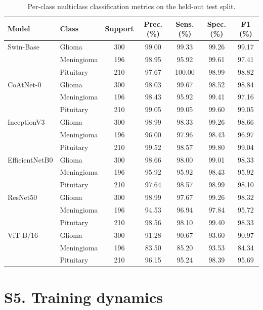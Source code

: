 \documentclass[11pt]{article}
\newcommand{\tablenumber}[1]{\setcounter{table}{\numexpr#1-1\relax}}
\begin{document}
\begin{table}[htbp]
\tablenumber{5}
\centering
\caption{Per-class multiclass classification metrics on the held-out test split.}
\label{tab:s5}
\small
\begin{tabular*}{\textwidth}{@{\extracolsep{\fill}}llccccc@{}}
\toprule
Model & Class & Support & Prec. (\%) & Sens. (\%) & Spec. (\%) & F1 (\%) \\
\midrule
Swin-Base & Glioma & 300 & 99.00 & 99.33 & 99.26 & 99.17 \\
 & Meningioma & 196 & 98.95 & 95.92 & 99.61 & 97.41 \\
 & Pituitary & 210 & 97.67 & 100.00 & 98.99 & 98.82 \\
\midrule
CoAtNet-0 & Glioma & 300 & 98.03 & 99.67 & 98.52 & 98.84 \\
 & Meningioma & 196 & 98.43 & 95.92 & 99.41 & 97.16 \\
 & Pituitary & 210 & 99.05 & 99.05 & 99.60 & 99.05 \\
\midrule
InceptionV3 & Glioma & 300 & 98.99 & 98.33 & 99.26 & 98.66 \\
 & Meningioma & 196 & 96.00 & 97.96 & 98.43 & 96.97 \\
 & Pituitary & 210 & 99.52 & 98.57 & 99.80 & 99.04 \\
\midrule
EfficientNetB0 & Glioma & 300 & 98.66 & 98.00 & 99.01 & 98.33 \\
 & Meningioma & 196 & 95.92 & 95.92 & 98.43 & 95.92 \\
 & Pituitary & 210 & 97.64 & 98.57 & 98.99 & 98.10 \\
\midrule
ResNet50 & Glioma & 300 & 98.99 & 97.67 & 99.26 & 98.32 \\
 & Meningioma & 196 & 94.53 & 96.94 & 97.84 & 95.72 \\
 & Pituitary & 210 & 98.56 & 98.10 & 99.40 & 98.33 \\
\midrule
ViT-B/16 & Glioma & 300 & 91.28 & 90.67 & 93.60 & 90.97 \\
 & Meningioma & 196 & 83.50 & 85.20 & 93.53 & 84.34 \\
 & Pituitary & 210 & 96.15 & 95.24 & 98.39 & 95.69 \\
\bottomrule
\end{tabular*}
\end{table}

\FloatBarrier
\section*{S5. Training dynamics}
\end{document}

